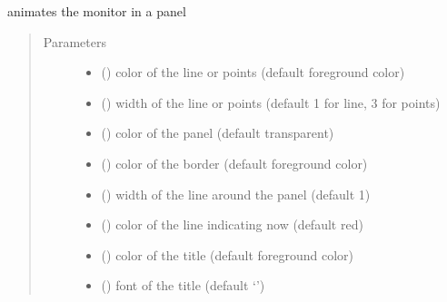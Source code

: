 \documentclass[letterpaper,10pt,english]{sphinxmanual}
\begin{document}
\begin{fulllineitems}
\begin{quote}
\begin{description}
\begin{itemize}
\end{itemize}

\end{description}\end{quote}

\begin{fulllineitems}
\label{\detokenize{Reference:salabim.Monitor.animate}}
animates the monitor in a panel
\begin{quote}\begin{description}
\item[{Parameters}] \leavevmode\begin{itemize}
\item {} 
 () \textendash{} color of the line or points (default foreground color)

\item {} 
 () \textendash{} width of the line or points (default 1 for line, 3 for points)

\item {} 
 () \textendash{} color of the panel (default transparent)

\item {} 
 () \textendash{} color of the border (default foreground color)

\item {} 
 () \textendash{} width of the line around the panel (default 1)

\item {} 
 () \textendash{} color of the line indicating now (default red)

\item {} 
 () \textendash{} color of the title (default foreground color)

\item {} 
 ({\hyperref[\detokenize{Reference:salabim.Animate.font}]{}}) \textendash{} font of the title (default ‘’)


\end{itemize}
\end{description}
\end{quote}
\end{fulllineitems}
\end{fulllineitems}
\end{document}
